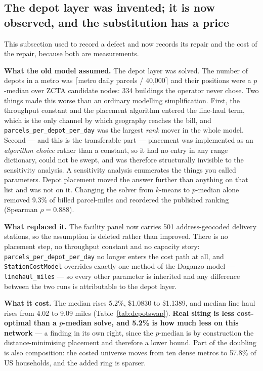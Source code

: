 \documentclass[conference]{IEEEtran}
\begin{document}
\subsection{The depot layer was invented; it is now observed, and the
substitution has a price}

This subsection used to record a defect and now records its repair and the
cost of the repair, because both are measurements.

\textbf{What the old model assumed.} The depot layer was solved. The number of
depots in a metro was $\lceil$metro daily parcels / 40{,}000$\rceil$ and their
positions were a $p$-median over ZCTA candidate nodes: 334 buildings the
operator never chose. Two things made this worse than an ordinary modelling
simplification. First, the throughput constant and the placement algorithm
entered the line-haul term, which is the only channel by which geography
reaches the bill, and \texttt{parcels\_per\_depot\_per\_day} was the largest
\emph{rank} mover in the whole model. Second --- and this is the transferable
part --- placement was implemented as an \emph{algorithm choice} rather than a
constant, so it had no entry in any range dictionary, could not be swept, and
was therefore structurally invisible to the sensitivity analysis. A sensitivity
analysis enumerates the things you called parameters. Depot placement moved the
answer further than anything on that list and was not on it. Changing the
solver from $k$-means to $p$-median alone removed 9.3\% of billed parcel-miles
and reordered the published ranking (Spearman $\rho = 0.888$).

\textbf{What replaced it.} The facility panel now carries 501 address-geocoded
delivery stations, so the assumption is deleted rather than improved. There is
no placement step, no throughput constant and no capacity story:
\texttt{parcels\_per\_depot\_per\_day} no longer enters the cost path at all,
and \texttt{StationCostModel} overrides exactly one method of the Daganzo model
--- \texttt{linehaul\_miles} --- so every other parameter is inherited and any
difference between the two runs is attributable to the depot layer.

\textbf{What it cost.} The median rises 5.2\%, \$1.0830 to \$1.1389, and
median line haul rises from 4.02 to 9.09 miles
(Table~\ref{tab:depotswap}). \textbf{Real siting is less cost-optimal than a
$p$-median solve, and 5.2\% is how much less on this network} --- a finding in
its own right, since the $p$-median is by construction the distance-minimising
placement and therefore a lower bound. Part of the doubling is also
composition: the costed universe moves from ten dense metros to 57.8\% of US
households, and the added ring is sparser.
\end{document}
